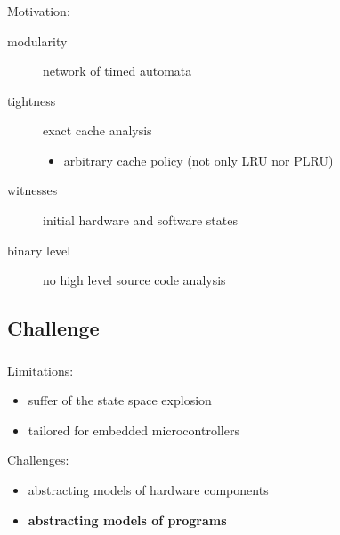 \documentclass{beamer}
\begin{document}
  \begin{frame}
    \frametitle{\secname}
    \framesubtitle{\subsecname}
    
    \begin{block}{Motivation:}
        \begin{description}
          \item[modularity] network of timed automata
          \item[tightness] exact cache analysis
            \begin{itemize} %
            \item arbitrary cache policy (not only LRU nor PLRU)
            \end{itemize}

          \vspace{1em}
          \item[witnesses] initial hardware and software states
          \item[binary level] no high level source code analysis
        \end{description}
    \end{block}
  \end{frame}
  
  \subsection{Challenge}
  \begin{frame}
    \frametitle{\secname}
    \framesubtitle{\subsecname}
      
    \begin{block}{Limitations:}
      \begin{itemize}
        \item suffer of the state space explosion
        \item tailored for embedded microcontrollers %
      \end{itemize}
    \end{block}
    
    \vspace{1em}
    \begin{block}{Challenges:}
      \begin{itemize}
        \item abstracting models of hardware components~\cite{CGM15}
        \item \textbf{abstracting models of programs}~\cite{BJ14,CB13,MBB16}
      \end{itemize}
    \end{block}
  \end{frame}
\end{document}
